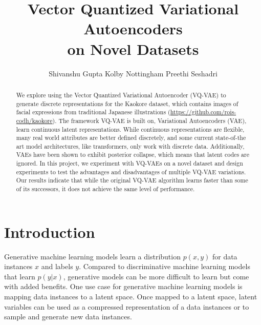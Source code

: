 \documentclass{article}
\title{Vector Quantized Variational Autoencoders \\on Novel Datasets}
\author{
  Shivanshu Gupta
  \And
  Kolby Nottingham
  \And
  Preethi Seshadri
}
\begin{document}
\maketitle

\begin{abstract}
    We explore using the Vector Quantized Variational Autoencoder (VQ-VAE) to generate discrete representations for the Kaokore dataset, which contains images of facial expressions from traditional Japanese illustrations (\url{https://github.com/rois-codh/kaokore}).
    The framework VQ-VAE is built on, Variational Autoencoders (VAE), learn continuous latent representations.
    While continuous representations are flexible, many real world attributes are better defined discretely, and some current state-of-the art model architectures, like transformers, only work with discrete data. Additionally, VAEs have been shown to exhibit posterior collapse, which means that latent codes are ignored. 
    In this project, we experiment with VQ-VAEs on a novel dataset and design experiments to test the advantages and disadvantages of multiple VQ-VAE variations.
    Our results indicate that while the original VQ-VAE algorithm learns faster than some of its successors, it does not achieve the same level of performance. 
\end{abstract}

\section{Introduction}

Generative machine learning models learn a distribution $p(x,y)$ for data instances $x$ and labels $y$. Compared to discriminative machine learning models that learn $p(y|x)$, generative models can be more difficult to learn but come with added benefits. One use case for generative machine learning models is mapping data instances to a latent space. Once mapped to a latent space, latent variables can be used as a compressed representation of a data instances or to sample and generate new data instances.
\end{document}
